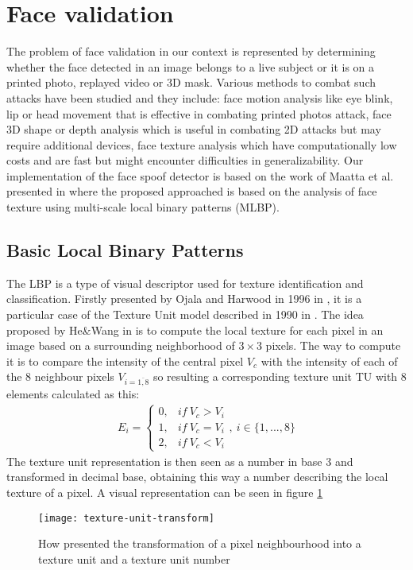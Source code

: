 \section{Face validation}
The problem of face validation in our context is represented by determining whether the face detected in an image belongs to a live subject or it is on a printed photo, replayed video or 3D mask. Various methods to combat such attacks have been studied and they include: face motion analysis \cite{BharadwajDVS13, PanSWL07, TirunagariPWISH15} like eye blink, lip or head movement that is effective in combating printed photos attack, face 3D shape or depth analysis \cite{MarsicoNRD12, LagorioTCFS13} which is useful in combating 2D attacks but may require additional devices, face texture analysis \cite{MaattaHP11} which have computationally low costs and are fast but might encounter difficulties in generalizability. Our implementation of the face spoof detector is based on the work of Maatta et al. presented in \cite{MaattaHP11} where the proposed approached is based on the analysis of face texture using multi-scale local binary patterns (MLBP).
\subsection{Basic Local Binary Patterns}
The LBP is a type of visual descriptor used for texture identification and classification. Firstly presented by Ojala and Harwood in 1996 in \cite{ojala1996comparative}, it is a particular case of the Texture Unit model described in 1990 in \cite{HeWang90}. The idea proposed by He\&Wang in \cite{HeWang90} is to compute the local texture for each pixel in an image based on a surrounding neighborhood of $3\times3$ pixels. The way to compute it is to compare the intensity of the central pixel $V_c$ with the intensity of each of the 8 neighbour pixels $V_{i=\overline{1,8}}$ so resulting a corresponding texture unit TU with 8 elements calculated as this:
\begin{align}
	E_i = \begin{cases}
	0, & if\ V_c > V_i \\
	1, & if\ V_c = V_i \\
	2, & if\ V_c < V_i
	\end{cases}, \ i \in \{1,...,8\}
\end{align}
The texture unit representation is then seen as a number in base 3 and transformed in decimal base, obtaining this way a number describing the local texture of a pixel.
A visual representation can be seen in figure \ref{visual-texture-unit}
\begin{figure}[h]
	\begin{center}
		\texttt{[image: texture-unit-transform]}
		\caption[Visual representation of texture unit transform]{How \cite{HeWang90} presented the transformation of a pixel neighbourhood into a texture unit and a texture unit number}
	\end{center}
	\label{visual-texture-unit}
\end{figure}

